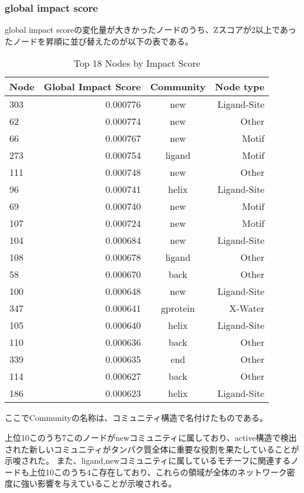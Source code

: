 \subsubsection{global impact score}
global impact scoreの変化量が大きかったノードのうち、Zスコアが2以上であったノードを昇順に並び替えたのが以下の表である。
\begin{table}[ht]
    \centering
    \begin{tabular}{|l|r|c|r|}
    \hline
    \textbf{Node} & \textbf{Global Impact Score} & \textbf{Community} & \textbf{Node type}\\
    \hline
    303 & 0.000776 & new & Ligand-Site \\
    62 & 0.000774 & new & Other \\
    66 & 0.000767 & new & Motif \\
    273 & 0.000754 & ligand & Motif \\
    111 & 0.000748 & new & Other \\
    96 & 0.000741 & helix & Ligand-Site \\
    69 & 0.000740 & new & Motif \\
    107 & 0.000724 & new & Motif \\
    104 & 0.000684 & new & Ligand-Site \\
    108 & 0.000678 & ligand & Other \\
    58 & 0.000670 & back & Other \\
    100 & 0.000648 & new & Ligand-Site \\
    347 & 0.000641 & gprotein & X-Water \\
    105 & 0.000640 & helix & Ligand-Site \\
    110 & 0.000636 & back & Other \\
    339 & 0.000635 & end & Other \\
    114 & 0.000627 & back & Other \\
    186 & 0.000623 & helix & Ligand-Site \\
    \hline
    \end{tabular}
    \caption{Top 18 Nodes by Impact Score}
\end{table}

\newpage

ここでCommunityの名称は、コミュニティ構造で名付けたものである。

上位10このうち7このノードがnewコミュニティに属しており、active構造で検出された新しいコミュニティがタンパク質全体に重要な役割を果たしていることが示唆された。
また、ligand,newコミュニティに属しているモチーフに関連するノードも上位10このうち4こ存在しており、これらの領域が全体のネットワーク密度に強い影響を与えていることが示唆される。

